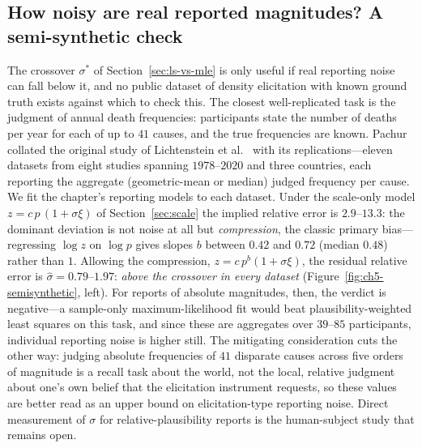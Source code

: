 \subsection{How noisy are real reported magnitudes? A semi-synthetic check}
\label{sec:semisynthetic}

The crossover $\sigma^{\ast}$ of Section~\ref{sec:ls-vs-mle} is only useful if real reporting noise can fall below it, and no public dataset of density elicitation with known ground truth exists against which to check this. The closest well-replicated task is the judgment of annual death frequencies: participants state the number of deaths per year for each of up to $41$ causes, and the true frequencies are known. Pachur \cite{Pachur2024} collated the original study of Lichtenstein et al.\ \cite{Lichtenstein1978} with its replications---eleven datasets from eight studies spanning $1978$--$2020$ and three countries, each reporting the aggregate (geometric-mean or median) judged frequency per cause. We fit the chapter's reporting models to each dataset. Under the scale-only model $z=c\,p\,(1+\sigma\xi)$ of Section~\ref{sec:scale} the implied relative error is $2.9$--$13.3$: the dominant deviation is not noise at all but \emph{compression}, the classic primary bias---regressing $\log z$ on $\log p$ gives slopes $b$ between $0.42$ and $0.72$ (median $0.48$) rather than $1$. Allowing the compression, $z=c\,p^{b}(1+\sigma\xi)$, the residual relative error is $\hat\sigma=0.79$--$1.97$: \emph{above the crossover in every dataset} (Figure~\ref{fig:ch5-semisynthetic}, left). For reports of absolute magnitudes, then, the verdict is negative---a sample-only maximum-likelihood fit would beat plausibility-weighted least squares on this task, and since these are aggregates over $39$--$85$ participants, individual reporting noise is higher still. The mitigating consideration cuts the other way: judging absolute frequencies of $41$ disparate causes across five orders of magnitude is a recall task about the world, not the local, relative judgment about one's own belief that the elicitation instrument requests, so these values are better read as an upper bound on elicitation-type reporting noise. Direct measurement of $\sigma$ for relative-plausibility reports is the human-subject study that remains open.

